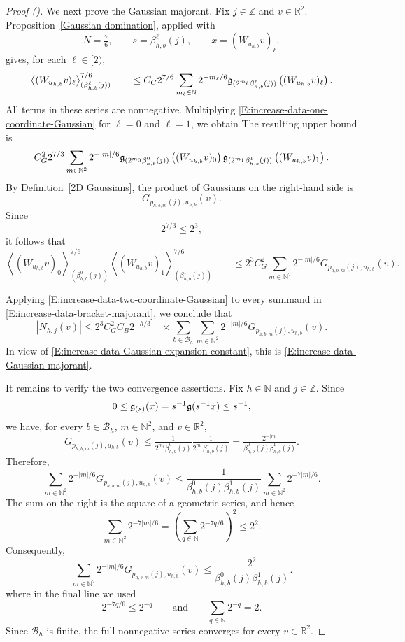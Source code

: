 \documentclass[12pt,reqno]{amsart}
\newcommand{\auto}{{({\tiny\faCar})}}
\theoremstyle{plain}
\numberwithin{equation}{section}
\theoremstyle{remark}
\begin{document}
\begin{proof}[Proof \auto]
We next prove the Gaussian majorant. Fix \(j\in\mathbb Z\) and
\(v\in\mathbb R^2\). Proposition~\ref{Gaussian domination}, applied
with
\[
N=\tfrac76,
\qquad
s=\beta_{h,b}^\ell(j),
\qquad
x=(W_{u_{h,b}}v)_\ell,
\]
gives, for each \(\ell\in[2)\),
\begin{equation}
    \label{E:increase-data-one-coordinate-Gaussian}
    \left\langle (W_{u_{h,b}}v)_\ell \right\rangle_{(\beta_{h,b}^\ell(j))}^{7/6} \qquad\leq C_G2^{7/6} \sum_{m_\ell\in\mathbb N} 2^{-m_\ell/6} \mathfrak{g}_{(2^{m_\ell}\beta_{h,b}^\ell(j))} \left((W_{u_{h,b}}v)_\ell\right).
\end{equation}
All terms in these series are nonnegative. Multiplying
\eqref{E:increase-data-one-coordinate-Gaussian} for
\(\ell=0\) and \(\ell=1\), we obtain
The resulting upper bound is
\[
C_G^2 2^{7/3}
\sum_{m\in\mathbb N^2}
2^{-|m|/6}
\mathfrak{g}_{(2^{m_0}\beta_{h,b}^0(j))}
\left((W_{u_{h,b}}v)_0\right)
\mathfrak{g}_{(2^{m_1}\beta_{h,b}^1(j))}
\left((W_{u_{h,b}}v)_1\right).
\]
By Definition~\ref{2D Gaussians}, the product of Gaussians on the
right-hand side is
\[
G_{p_{h,b,m}(j),u_{h,b}}(v).
\]
Since
\[
2^{7/3}\leq2^3,
\]
it follows that
\begin{equation}
    \label{E:increase-data-two-coordinate-Gaussian}
    \left\langle (W_{u_{h,b}}v)_0 \right\rangle_{(\beta_{h,b}^0(j))}^{7/6} \left\langle (W_{u_{h,b}}v)_1 \right\rangle_{(\beta_{h,b}^1(j))}^{7/6} \qquad\leq 2^3C_G^2 \sum_{m\in\mathbb N^2} 2^{-|m|/6} G_{p_{h,b,m}(j),u_{h,b}}(v).
\end{equation}

Applying \eqref{E:increase-data-two-coordinate-Gaussian} to every
summand in
\eqref{E:increase-data-bracket-majorant}, we conclude that
\[
|N_{h,j}(v)| \leq 2^3C_G^2C_B 2^{-h/3} \quad\times \sum_{b\in\mathcal B_h} \sum_{m\in\mathbb N^2} 2^{-|m|/6} G_{p_{h,b,m}(j),u_{h,b}}(v).
\]
In view of
\eqref{E:increase-data-Gaussian-expansion-constant}, this is
\eqref{E:increase-data-Gaussian-majorant}.

It remains to verify the two convergence assertions. Fix
\(h\in\mathbb N\) and \(j\in\mathbb Z\). Since
\[
0\leq\mathfrak{g}_{(s)}(x)
=
s^{-1}\mathfrak{g}(s^{-1}x)
\leq s^{-1},
\]
we have, for every \(b\in\mathcal B_h\), \(m\in\mathbb N^2\),
and \(v\in\mathbb R^2\),
\[
G_{p_{h,b,m}(j),u_{h,b}}(v) \leq \tfrac{1}{ 2^{m_0}\beta_{h,b}^0(j) } \tfrac{1}{ 2^{m_1}\beta_{h,b}^1(j) } = \tfrac{2^{-|m|}}{ \beta_{h,b}^0(j)\beta_{h,b}^1(j) }.
\]
Therefore,
\[
\sum_{m\in\mathbb N^2}
2^{-|m|/6}
G_{p_{h,b,m}(j),u_{h,b}}(v)
\leq
\frac{1}{
\beta_{h,b}^0(j)\beta_{h,b}^1(j)
}
\sum_{m\in\mathbb N^2}
2^{-7|m|/6}.
\]
The sum on the right is the square of a geometric series, and hence
\[
\sum_{m\in\mathbb N^2}2^{-7|m|/6}
=
\left(
\sum_{q\in\mathbb N}2^{-7q/6}
\right)^2
\leq2^2.
\]
Consequently,
\[
\sum_{m\in\mathbb N^2}
2^{-|m|/6}
G_{p_{h,b,m}(j),u_{h,b}}(v)
\leq
\frac{2^2}{
\beta_{h,b}^0(j)\beta_{h,b}^1(j)
}.
\]
where in the final line we used
\[
2^{-7q/6}\leq2^{-q}
\qquad\text{and}\qquad
\sum_{q\in\mathbb N}2^{-q}=2.
\]
Since \(\mathcal B_h\) is finite, the full nonnegative series
converges for every \(v\in\mathbb R^2\).


\end{proof}
\end{document}
